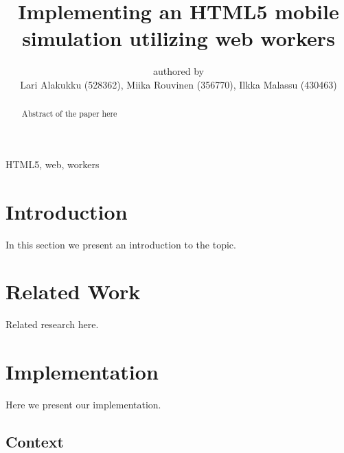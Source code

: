 \documentclass[conference]{IEEEtran}
\begin{document}
\title{Implementing an HTML5 mobile simulation utilizing web workers}

\author{authored by\\
        Lari Alakukku (528362),
        Miika Rouvinen (356770),
        Ilkka Malassu (430463)}%

\makeatletter         
\def\@maketitle{
\begin{center}
{\Huge \bfseries \sffamily \@title }\\[4ex] 
Submitted on \@date\\
{\normalsize \@author}\\[4ex] 
\end{center}}
\makeatother


\maketitle

\begin{IEEEkeywords}
HTML5, web, workers
\end{IEEEkeywords}

\begin{abstract}

Abstract of the paper here
 
\end{abstract}

\section{Introduction}
\label{chap:introduction}

In this section we present an introduction to the topic.

\section{Related Work}
\label{sec:soa}

Related research here.

\section{Implementation}

Here we present our implementation.

\subsection{Context} 
\label{sec:context}
\end{document}
